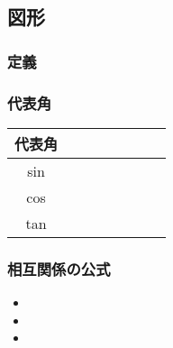 \documentclass[10pt,dvipdfmx]{jsarticle}
\begin{document}
\subsection*{図形}
\begin{table}[h]
  \begin{minipage}[h]{0.3\textwidth}
    \subsubsection*{定義}
  \end{minipage}
  \begin{minipage}[h]{0.7\textwidth}
    \subsubsection*{代表角}
    {\renewcommand\arraystretch{2}
      \begin{table}[H]
        \begin{tabular}{|c||p{1cm}|p{1cm}|p{1cm}|p{1cm}|p{1cm}|p{1cm}|p{1cm}|}
          \hline
          代表角 &  &  &  &  &  &  & \\
          \hline
          sin    &  &  &  &  &  &  & \\
          \hline
          cos    &  &  &  &  &  &  & \\
          \hline
          tan    &  &  &  &  &  &  & \\
          \hline
        \end{tabular}
      \end{table}
    }
  \end{minipage}

\end{table}




\subsubsection*{相互関係の公式}
\begin{multicols}{3}
  \begin{Large}
    \begin{itemize}
      \item
      \item
      \item
    \end{itemize}
  \end{Large}
\end{multicols}
\end{document}
